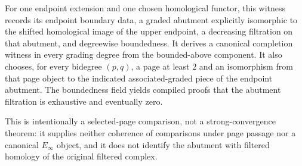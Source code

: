 \begin{definition}
  \label{def:page-abutment-comparison-witness}
  \leanok
  For one endpoint extension and one chosen homological functor, this witness
  records its endpoint boundary data, a graded abutment explicitly isomorphic
  to the shifted homological image of the upper endpoint, a decreasing
  filtration on that abutment, and degreewise boundedness.  It derives a
  canonical completion witness in every grading degree from the bounded-above
  component.  It also chooses, for every bidegree $(p,q)$, a page at least $2$
  and an isomorphism from that page object to the indicated associated-graded
  piece of the endpoint abutment.  The boundedness field yields compiled proofs
  that the abutment filtration is exhaustive and eventually zero.

  This is intentionally a selected-page comparison, not a strong-convergence
  theorem: it supplies neither coherence of comparisons under page passage nor
  a canonical $E_\infty$ object, and it does not identify the abutment with
  filtered homology of the original filtered complex.
\end{definition}


